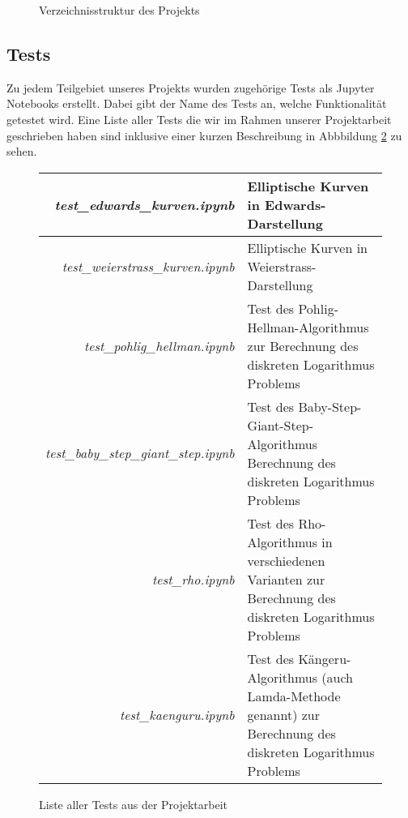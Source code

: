 \documentclass{scrartcl}
\begin{document}
\begin{figure}[h]
  \caption{Verzeichnisstruktur des Projekts}
  \label{fig:verzeichnisstruktur}
\end{figure}

\subsection{Tests}
\label{sec:tests}

Zu jedem Teilgebiet unseres Projekts wurden zugehörige Tests als Jupyter Notebooks erstellt. Dabei gibt der Name des Tests an, welche Funktionalität getestet wird. Eine Liste aller Tests die wir im Rahmen unserer Projektarbeit geschrieben haben sind inklusive einer kurzen Beschreibung in Abbbildung \ref{fig:tests} zu sehen.
\begin{figure}[h]
 \centering
 \renewcommand{\arraystretch}{1.5}
 \begin{tabular}{r|p{8cm}}
  \emph{test\_edwards\_kurven.ipynb} & Elliptische Kurven in Edwards-Darstellung  \\
  \hline \emph{test\_weierstrass\_kurven.ipynb} & Elliptische Kurven in Weierstrass-Darstellung \\
  \hline \emph{test\_pohlig\_hellman.ipynb} & Test des Pohlig-Hellman-Algorithmus zur Berechnung des diskreten Logarithmus Problems \\
  \hline \emph{test\_baby\_step\_giant\_step.ipynb} & Test des Baby-Step-Giant-Step-Algorithmus Berechnung des diskreten Logarithmus Problems \\
  \hline \emph{test\_rho.ipynb} & Test des Rho-Algorithmus in verschiedenen Varianten zur Berechnung des diskreten Logarithmus Problems \\
  \hline \emph{test\_kaenguru.ipynb} & Test des Kängeru-Algorithmus (auch Lamda-Methode genannt) zur Berechnung des diskreten Logarithmus Problems \\
 \end{tabular}
 \renewcommand{\arraystretch}{1}
 \caption{Liste aller Tests aus der Projektarbeit}
 \label{fig:tests}
\end{figure}
\end{document}
